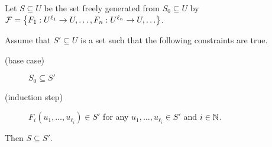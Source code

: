 \begin{theorem}
\label{theorem:structural-induction}
    Let $S \subseteq U$ be the set freely generated from $S_0 \subseteq U$ by
    $\mathcal{F} =
      \set{F_1 : U^{\ell_1} \to U, \dots, F_n : U^{\ell_n} \to U, \dots }$.

    Assume that $S' \subseteq U$ is a set such that the following constraints
    are true.
    \begin{description}
        \item [(base case)] $S_0 \subseteq S'$
        \item[(induction step)]
          $F_i(u_1, \dots, u_{\ell_i}) \in S'$ for any
          $u_1, \dots, u_{\ell_i} \in S'$ and $i \in {\mathbb{N}}$.
    \end{description}
    Then $S \subseteq S'$.
\end{theorem}

